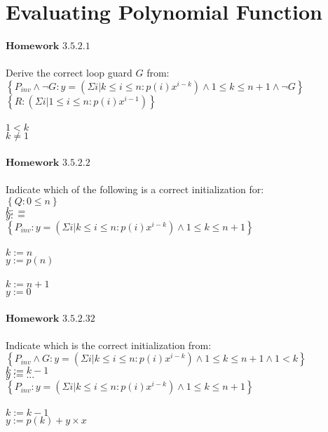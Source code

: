 \documentclass{article}
\author{Krystal Maughan }
\date{May 4th 2017}
\begin{document}
\section{Evaluating Polynomial Function}
$\mathbf{Homework}$ $\mathbf{3.5.2.1}$
\\
\\
Derive the correct loop guard $G$ from:
\\
$\left\{P_{inv} \land \neg G : y = (\Sigma i | k \leq i \leq n : p(i)x^{i - k}) \land 1 \leq k \leq n + 1 \land \neg G\right\}$
\\
$\left\{ R : (\Sigma i | 1 \leq i \leq n : p(i) x^{i - 1})\right\}$
\\
\\
$ 1 < k$
\\
$k \neq 1$
\\
\\
$\mathbf{Homework}$ $\mathbf{3.5.2.2}$
\\
\\
Indicate which of the following is a correct initialization for:
\\
$\left\{ Q : 0 \leq n\right\}$
\\
$k : = $
\\
$ y : = $
\\
$\left\{P_{inv} : y = (\Sigma i | k \leq i \leq n : p(i) x^{i - k}) \land 1 \leq k \leq n + 1\right\}$
\\
\\
$k := n$
\\
$y := p(n)$
\\
\\
$k := n + 1$
\\
$y := 0$
\\
\\
$\mathbf{Homework}$ $\mathbf{3.5.2.32}$
\\
\\
Indicate which is the correct initialization from:
\\
$\left\{P_{inv} \land G: y = (\Sigma i | k \leq i \leq n : p(i) x^{i - k}) \land 1 \leq k \leq n + 1 \land 1 < k\right\}$
\\
$k := k - 1$
\\
$y := ...$
\\
$\left\{P_{inv} : y = (\Sigma i | k \leq i \leq n : p(i) x^{i - k}) \land 1 \leq k \leq n + 1\right\}$
\\
\\
$k := k - 1$
\\
$y := p(k) + y \times x$
\end{document}
